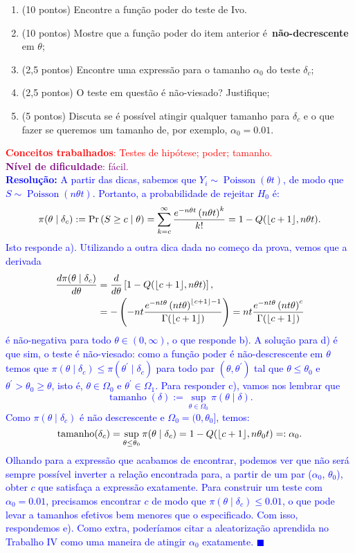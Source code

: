 \documentclass[a4paper,10pt, notitlepage]{report}
\newcommand{\pr}{\operatorname{Pr}} %
\DeclarePairedDelimiter\floor{\lfloor}{\rfloor}
\begin{document}
\begin{enumerate}[label=\alph*)]
 \item (10 pontos) Encontre a função poder do teste de Ivo.
 \item (10 pontos) Mostre que a função poder do item anterior é~\textbf{não-decrescente} em $\theta$;
 \item (2,5 pontos) Encontre uma expressão para o tamanho $\alpha_0$ do teste $\delta_c$;
 \item (2,5 pontos) O teste em questão é não-viesado? Justifique;
 \item (5 pontos) Discuta se é possível atingir qualquer tamanho para $\delta_c$ e o que fazer se queremos um tamanho de, por exemplo, $\alpha_0 = 0.01$.
\end{enumerate}
\textcolor{red}{\textbf{Conceitos trabalhados}: Testes de hipótese; poder; tamanho.}\\ \textcolor{purple}{\textbf{Nível de dificuldade}: fácil.}\\
\textcolor{blue}{
\textbf{Resolução:}
A partir das dicas, sabemos que $Y_i \sim\operatorname{Poisson}(\theta t)$, de modo que $S \sim\operatorname{Poisson}(n\theta t)$.
Portanto, a probabilidade de rejeitar $H_0$ é:
$$\pi(\theta \mid \delta_c) := \pr\left(S \geq c \mid \theta \right) = \sum_{k=c}^\infty \frac{e^{-n\theta t} \left(n\theta t\right)^k}{k!} = 1 - Q(\floor*{c + 1}, n\theta t).$$
Isto responde a).
Utilizando a outra dica dada no começo da prova, vemos que  a derivada
\begin{align*}
 \frac{d\pi(\theta \mid \delta_c)}{d\theta} &= \frac{d}{d\theta} \left[1 - Q(\floor*{c + 1}, n\theta t)\right],\\
 &= -\left(-nt\frac{e^{-nt\theta}\left(nt\theta\right)^{\floor*{c+1}-1}}{\Gamma(\floor*{c + 1})}\right) = nt\frac{e^{-nt\theta}\left(nt\theta\right)^{c}}{\Gamma(\floor*{c + 1})}
\end{align*}
é não-negativa para todo $\theta \in (0, \infty)$, o que responde b).
A solução para d) é que sim, o teste é não-viesado: como a função poder é não-descrescente em $\theta$ temos que $\pi(\theta \mid \delta_c) \leq \pi(\theta^\prime \mid \delta_c)$ para todo par $(\theta, \theta^\prime)$ tal que $\theta \leq \theta_0$ e $\theta^\prime > \theta_0 \geq \theta$, isto é, $\theta \in \Omega_0$ e $\theta^\prime \in \Omega_1$.
Para responder c), vamos nos lembrar que 
$$\operatorname{tamanho}(\delta) := \sup_{\theta \in \Omega_0} \pi(\theta \mid \delta).$$
Como $\pi(\theta \mid \delta_c)$ é não descrescente e $\Omega_0 = (0, \theta_0]$, temos:
$$\operatorname{tamanho}(\delta_c) = \sup_{\theta \leq \theta_0} \pi(\theta \mid \delta_c) = 1-Q(\floor*{c + 1}, n\theta_0t) =: \alpha_0.$$
Olhando para a expressão que acabamos de encontrar, podemos ver que não será sempre possível inverter a relação encontrada para, a partir de um par ($\alpha_0$, $\theta_0$), obter $c$ que satisfaça a expressão exatamente.
Para construir um teste com $\alpha_0 = 0.01$, precisamos encontrar $c$ de modo que $\pi(\theta \mid \delta_c) \leq 0.01$, o que pode levar a tamanhos efetivos bem menores que o especificado.
Com isso, respondemos e).
Como extra, poderíamos citar a aleatorização aprendida no Trabalho IV como uma maneira de atingir $\alpha_0$ exatamente.
$\blacksquare$
}
\end{document}
